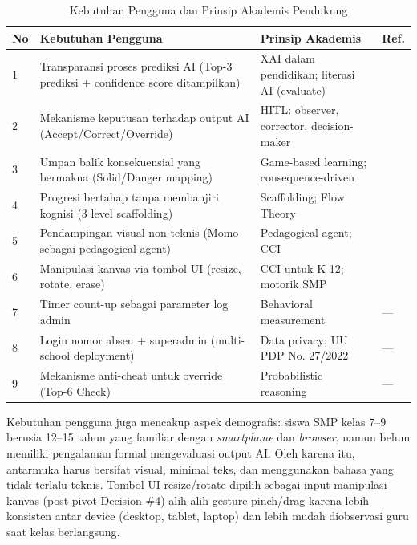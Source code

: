 \documentclass[12pt,a4paper,oneside,openany]{report}
\begin{document}
\begin{table}[H]
\centering
\caption{Kebutuhan Pengguna dan Prinsip Akademis Pendukung}
\label{tab:kebutuhan-pengguna}
\begin{tabular}{|p{0.5cm}|p{5cm}|p{4cm}|p{2.5cm}|}
\hline
\textbf{No} & \textbf{Kebutuhan Pengguna} & \textbf{Prinsip Akademis} & \textbf{Ref.} \\ \hline
1 & Transparansi proses prediksi AI (Top-3 prediksi + confidence score ditampilkan) & XAI dalam pendidikan; literasi AI (evaluate) & \cite{ref1}\cite{ref3} \\ \hline
2 & Mekanisme keputusan terhadap output AI (Accept/Correct/Override) & HITL: observer, corrector, decision-maker & \cite{ref4}\cite{ref5} \\ \hline
3 & Umpan balik konsekuensial yang bermakna (Solid/Danger mapping) & Game-based learning; consequence-driven & \cite{ref6} \\ \hline
4 & Progresi bertahap tanpa membanjiri kognisi (3 level scaffolding) & Scaffolding; Flow Theory & \cite{ref6}\cite{ref7} \\ \hline
5 & Pendampingan visual non-teknis (Momo sebagai pedagogical agent) & Pedagogical agent; CCI & \cite{ref8} \\ \hline
6 & Manipulasi kanvas via tombol UI (resize, rotate, erase) & CCI untuk K-12; motorik SMP & \cite{ref2} \\ \hline
7 & Timer count-up sebagai parameter log admin & Behavioral measurement & --- \\ \hline
8 & Login nomor absen + superadmin (multi-school deployment) & Data privacy; UU PDP No. 27/2022 & --- \\ \hline
9 & Mekanisme anti-cheat untuk override (Top-6 Check) & Probabilistic reasoning & --- \\ \hline
\end{tabular}
\end{table}

Kebutuhan pengguna juga mencakup aspek demografis: siswa SMP kelas 7--9 berusia 12--15 tahun yang familiar dengan \textit{smartphone} dan \textit{browser}, namun belum memiliki pengalaman formal mengevaluasi output AI. Oleh karena itu, antarmuka harus bersifat visual, minimal teks, dan menggunakan bahasa yang tidak terlalu teknis. Tombol UI resize/rotate dipilih sebagai input manipulasi kanvas (post-pivot Decision \#4) alih-alih gesture pinch/drag karena lebih konsisten antar device (desktop, tablet, laptop) dan lebih mudah diobservasi guru saat kelas berlangsung.
\end{document}
